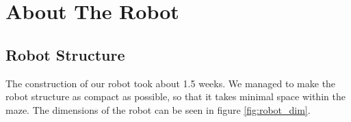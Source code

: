 \section{About The Robot}
\subsection{Robot Structure}

The construction of our robot took about 1.5 weeks.
We managed to make the robot structure as compact as possible, so that it takes minimal space within the maze.
The dimensions of the robot can be seen in figure \ref{fig:robot_dim}.


